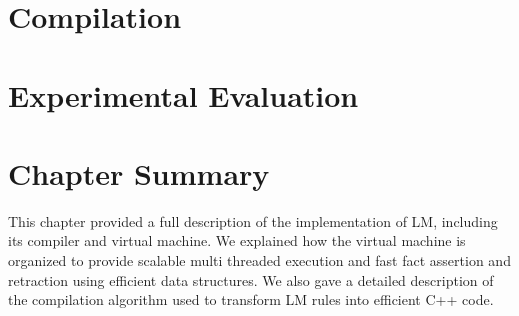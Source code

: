 


\section{Compilation}


\section{Experimental Evaluation}
\section{Chapter Summary}

This chapter provided a full description of the implementation of LM, including
its compiler and virtual machine. We explained how the virtual machine is
organized to provide scalable multi threaded execution and fast fact assertion
and retraction using efficient data structures. We also gave a detailed
description of the compilation algorithm used to transform LM rules into
efficient C++ code.
